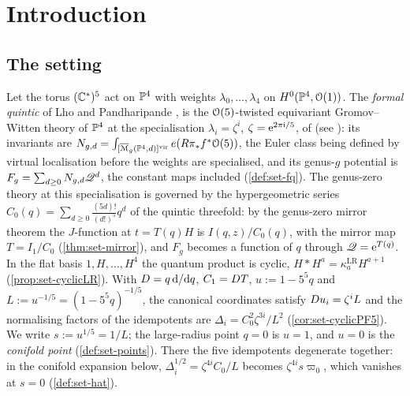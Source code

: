 \section{Introduction}
\label{sec:int}

\subsection{The setting}
\label{sec:int-setting}

Let the torus $(\mathbb{C}^*)^5$ act on $\mathbb{P}^4$ with weights $\lambda_0,\dots,\lambda_4$ on $H^0(\mathbb{P}^4,\mathcal{O}(1))$. The \emph{formal quintic} of Lho and Pandharipande \cite[\S0.2, (5)]{LP18}, \cite[\S0.2, (5)]{LP20} is the $\mathcal{O}(5)$-twisted equivariant Gromov--Witten theory of $\mathbb{P}^4$ at the specialisation $\lambda_i=\zeta^i$, $\zeta=\mathrm{e}^{2\pi\mathrm{i}/5}$, of \cite{ZZ08} (see \cite[\S3.1, (9)]{GJR18}): its invariants are $N_{g,d}=\int_{[\overline{\mathcal M}_g(\mathbb{P}^4,d)]^{\mathrm{vir}}}e(R\pi_*f^*\mathcal{O}(5))$, the Euler class being defined by virtual localisation \cite{MR1666787} before the weights are specialised, and its genus-$g$ potential is $F_g=\sum_{d\geq0}N_{g,d}\mathscr{Q}^d$, the constant maps included (\cref{def:set-fq}). The genus-zero theory at this specialisation is governed by the hypergeometric series $C_0(q)=\sum_{d\geq0}\frac{(5d)!}{(d!)^5}q^d$ of the quintic threefold: by the genus-zero mirror theorem the $J$-function at $t=T(q)H$ is $I(q,z)/C_0(q)$, with the mirror map $T=I_1/C_0$ (\cref{thm:set-mirror}), and $F_g$ becomes a function of $q$ through $\mathscr{Q}=\mathrm{e}^{T(q)}$. In the flat basis $1,H,\dots,H^4$ the quantum product is cyclic, $H*H^a=\kappa^{\mathrm{LR}}_aH^{a+1}$ (\cref{prop:set-cyclicLR}). With $D=q\,\mathrm{d}/\mathrm{d} q$, $C_1=D T$, $u:=1-5^5q$ and $L:=u^{-1/5}=(1-5^5q)^{-1/5}$, the canonical coordinates satisfy $D u_i=\zeta^iL$ and the normalising factors of the idempotents are $\Delta_i=C_0^2\zeta^{3i}/L^2$ (\cref{cor:set-cyclicPF5}). We write $s:=u^{1/5}=1/L$; the large-radius point $q=0$ is $u=1$, and $u=0$ is the \emph{conifold point} (\cref{def:set-points}). There the five idempotents degenerate together: in the conifold expansion below, $\Delta_i^{1/2}=\zeta^{4i}C_0/L$ becomes $\zeta^{4i}s\varpi_0$, which vanishes at $s=0$ (\cref{def:set-hat}).

